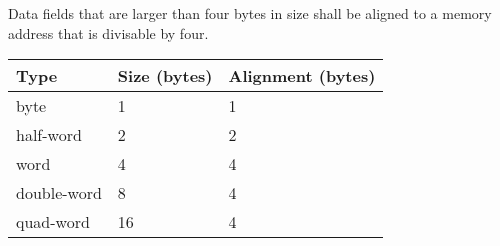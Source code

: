 Data fields that are larger than four bytes in size shall be aligned to a
memory address that is divisable by four.

\begin{tabular}{|l|l|l|}
  \hline
  \textbf{Type} & \textbf{Size (bytes)} & \textbf{Alignment (bytes)} \\
  \hline
  byte & 1 & 1 \\
  \hline
  half-word & 2 & 2 \\
  \hline
  word & 4 & 4 \\
  \hline
  double-word & 8 & 4 \\
  \hline
  quad-word & 16 & 4 \\
  \hline
\end{tabular}
